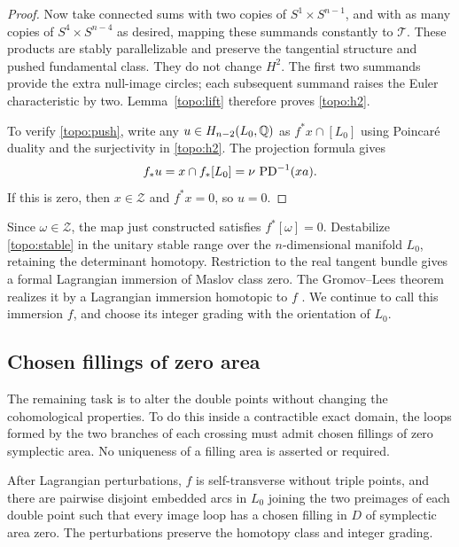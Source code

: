 \begin{proof}
Now take connected sums with two copies of $S^1\times S^{n-1}$,
and with as many copies of $S^4\times S^{n-4}$ as desired, mapping
these summands constantly to $\mathscr T$.  These products are
stably parallelizable and preserve the tangential structure and
pushed fundamental class.  They do not change $H^2$.  The first
two summands provide the extra null-image circles; each subsequent
summand raises the Euler characteristic by two.  Lemma~\ref{topo:lift}
therefore proves \eqref{topo:h2}.

To verify \eqref{topo:push}, write any $u\in H_{n-2}(L_0,\mathbb Q)$ as
$f^*x\cap[L_0]$ using Poincar\'e duality and the surjectivity in
\eqref{topo:h2}.  The projection formula gives
\[
 f_*u=x\cap f_*[L_0]=\nu\,\operatorname{PD}^{-1}(xa).
\]
If this is zero, then $x\in\mathcal Z$ and $f^*x=0$, so $u=0$.
\end{proof}

Since $\omega\in\mathcal Z$, the map just constructed satisfies
$f^*[\omega]=0$.  Destabilize \eqref{topo:stable} in the unitary
stable range over the $n$-dimensional manifold $L_0$, retaining the
determinant homotopy.  Restriction to the real tangent bundle gives
a formal Lagrangian immersion of Maslov class zero.  The
Gromov--Lees theorem realizes it by a Lagrangian immersion homotopic
to $f$ \cite{GromovLees,RathelFournier2024}.  We continue to call
this immersion $f$, and choose its integer grading with the
orientation of $L_0$.

\subsection{Chosen fillings of zero area}

The remaining task is to alter the double points without changing
the cohomological properties.  To do this inside a contractible
exact domain, the loops formed by the two branches of each crossing
must admit chosen fillings of zero symplectic area.  No uniqueness
of a filling area is asserted or required.

\begin{lemma}\label{topo:zero-actions}
After Lagrangian perturbations, $f$ is self-transverse without triple
points, and there are pairwise disjoint embedded arcs in $L_0$
joining the two preimages of each double point such that every
image loop has a chosen filling in $D$ of symplectic area zero.
The perturbations preserve the homotopy class and integer grading.
\end{lemma}

